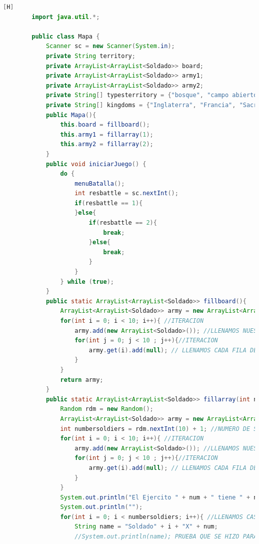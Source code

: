 \documentclass{article}
\begin{document}
	\begin{lstlisting}[language=java,caption={Las lineas de codigos de la clase Mapa creada:}][H]
		import java.util.*;

		public class Mapa {
			Scanner sc = new Scanner(System.in);
			private String territory;
			private ArrayList<ArrayList<Soldado>> board;
			private ArrayList<ArrayList<Soldado>> army1;
			private ArrayList<ArrayList<Soldado>> army2;	
			private String[] typesterritory = {"bosque", "campo abierto", "montana", "desierto", "playa"};
			private String[] kingdoms = {"Inglaterra", "Francia", "Sacro", "Castilla", "Aragon", "Moros"};
			public Mapa(){
				this.board = fillboard();
				this.army1 = fillarray(1);
				this.army2 = fillarray(2);
			}
			public void iniciarJuego() {
				do {
					menuBatalla();
					int resbattle = sc.nextInt();
					if(resbattle == 1){
					}else{
						if(resbattle == 2){
							break;
						}else{
							break;
						}
					}
				} while (true);
			}
			public static ArrayList<ArrayList<Soldado>> fillboard(){
				ArrayList<ArrayList<Soldado>> army = new ArrayList<ArrayList<Soldado>>();
				for(int i = 0; i < 10; i++){ //ITERACION
					army.add(new ArrayList<Soldado>()); //LLENAMOS NUESTROS ARRAYLIST BIDIMENSIONAL CON CADA FILA PARA QUE CUMPLAN CON ESTRUCTURA DEL TABLERO
					for(int j = 0; j < 10 ; j++){//ITERACION
						army.get(i).add(null); // LLENAMOS CADA FILA DEL ARRAYLIST CON UN OBJETO SOLDADO CON TAL QUE ESTE SEA NULL PARA QUE SEPA QUE ESTE TIENE UNA CASILLA PERO NO HAY NADIE TODAVIA SE PUEDE LLENAR 
					}
				}
				return army;
			}
			public static ArrayList<ArrayList<Soldado>> fillarray(int num){
				Random rdm = new Random();
				ArrayList<ArrayList<Soldado>> army = new ArrayList<ArrayList<Soldado>>();
				int numbersoldiers = rdm.nextInt(10) + 1; //NUMERO DE SOLDADOS ALEATORIOS ENTRE 1 A 10 SOLDADOS 
				for(int i = 0; i < 10; i++){ //ITERACION
					army.add(new ArrayList<Soldado>()); //LLENAMOS NUESTROS ARRAYLIST BIDIMENSIONAL CON CADA FILA PARA QUE CUMPLAN CON ESTRUCTURA DEL TABLERO
					for(int j = 0; j < 10 ; j++){//ITERACION
						army.get(i).add(null); // LLENAMOS CADA FILA DEL ARRAYLIST CON UN OBJETO SOLDADO CON TAL QUE ESTE SEA NULL PARA QUE SEPA QUE ESTE TIENE UNA CASILLA PERO NO HAY NADIE TODAVIA SE PUEDE LLENAR 
					}
				}
				System.out.println("El Ejercito " + num + " tiene " + numbersoldiers + " soldados : " ); 
				System.out.println("");
				for(int i = 0; i < numbersoldiers; i++){ //LLENAMOS CASILLAS CON CADA SOLDADO CREADO ALEATORIAMENTE
					String name = "Soldado" + i + "X" + num;
					//System.out.println(name); PRUEBA QUE SE HIZO PARA VER LOS NOMBRES

\end{lstlisting}
\end{document}

